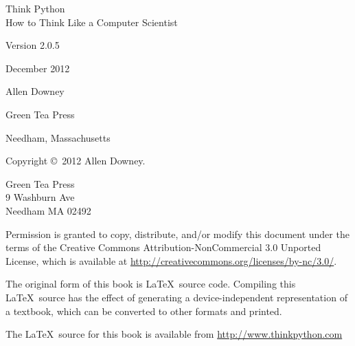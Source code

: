 \documentclass[10pt]{book}
\newcommand{\theversion}{2.0.5}
\newcommand{\thedate}{December 2012}
\begin{document}
\begin{CJK}{UTF8}{gbsn}
\begin{latexonly}
\pagebreak
\thispagestyle{empty}

\begin{flushright}
\vspace*{2.0in}

\begin{spacing}{3}
{\huge Think Python}\\
{\Large How to Think Like a Computer Scientist}
\end{spacing}

\vspace{0.25in}

Version \theversion

\thedate

\vspace{1in}


{\Large
Allen Downey\\
}


\vspace{0.5in}

{\Large Green Tea Press}

{\small Needham, Massachusetts}

\vfill

\end{flushright}


\pagebreak
\thispagestyle{empty}

{\small
Copyright \copyright ~2012 Allen Downey.


\vspace{0.2in}

\begin{flushleft}
Green Tea Press       \\
9 Washburn Ave        \\
Needham MA 02492
\end{flushleft}

Permission is granted to copy, distribute, and/or modify this document
under the terms of the Creative Commons Attribution-NonCommercial 3.0 Unported
License, which is available at \url{http://creativecommons.org/licenses/by-nc/3.0/}.

The original form of this book is \LaTeX\ source code.  Compiling this
\LaTeX\ source has the effect of generating a device-independent
representation of a textbook, which can be converted to other formats
and printed.

The \LaTeX\ source for this book is available from
\url{http://www.thinkpython.com}

}
\end{latexonly}
\end{CJK}
\end{document}
